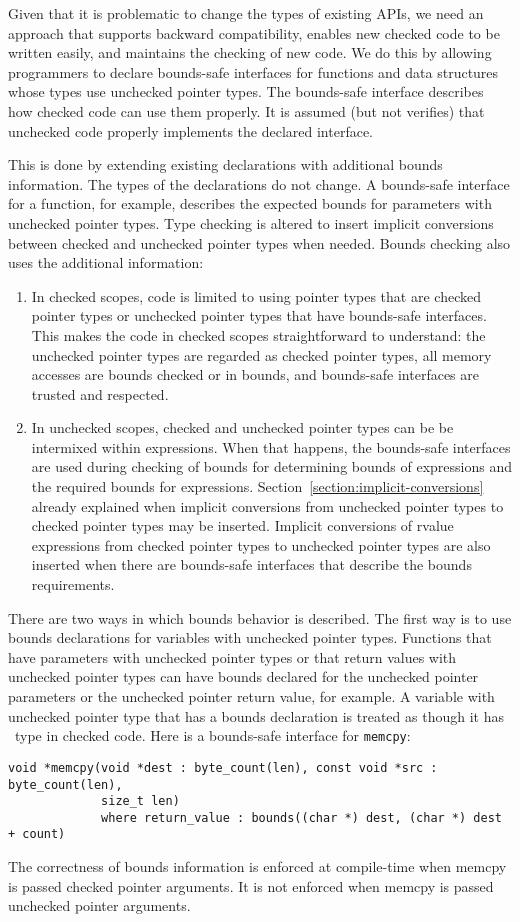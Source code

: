 Given that it is problematic to change the types of existing APIs, we need an approach
that supports backward compatibility, enables new checked code to be written easily, and
maintains the checking of new code.  We do this by allowing programmers to  
declare bounds-safe interfaces for functions and data structures whose types use
unchecked pointer types. The bounds-safe interface describes how checked 
code can use them properly.   It is assumed (but not verifies) that unchecked code 
properly implements the declared interface.

This is done by extending existing declarations with additional bounds
information.  The types of the declarations do not change.  A bounds-safe
interface for a function, for example, describes the expected bounds for
parameters with unchecked pointer types.   Type checking is altered to
insert implicit conversions between checked and unchecked pointer types 
when needed.   Bounds checking also uses the additional information:
\begin{enumerate}
\item
  In checked scopes, code is limited to using pointer types that are 
  checked pointer types or unchecked pointer types that have bounds-safe interfaces.
  This makes the code in checked scopes straightforward to understand:
  the unchecked pointer types are regarded as checked pointer types, all memory
  accesses are bounds checked or in bounds, and bounds-safe interfaces are trusted
  and respected.
\item
  In unchecked scopes, checked and unchecked pointer types can be
  be intermixed within expressions.  When that happens, the bounds-safe
  interfaces are used during checking of bounds for determining bounds
  of expressions and the required bounds for expressions. 
  Section~\ref{section:implicit-conversions} already
  explained when implicit conversions from unchecked pointer types to checked pointer
  types may be inserted.   Implicit conversions of rvalue expressions 
  from checked pointer types to unchecked pointer types are also inserted when
  there are bounds-safe interfaces that describe the bounds requirements.
\end{enumerate}

There are two ways in which bounds behavior is described.   The first
way is to use bounds declarations for variables with unchecked
pointer types.  Functions that have parameters with unchecked pointer 
types or that return values with unchecked pointer types can have bounds
declared for the unchecked pointer parameters or the unchecked pointer return value, for example.
A variable with unchecked pointer type that has a bounds
declaration is treated as though it has \arrayptr\ type in checked code.  
Here is a bounds-safe interface 
for \texttt{memcpy}:
\begin{verbatim}
void *memcpy(void *dest : byte_count(len), const void *src : byte_count(len), 
             size_t len) 
             where return_value : bounds((char *) dest, (char *) dest + count)
\end{verbatim}
The correctness of bounds information is enforced at compile-time when
memcpy is passed checked pointer arguments. It is not enforced when memcpy
is passed unchecked pointer arguments.

